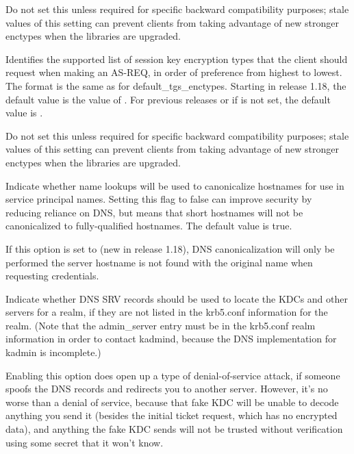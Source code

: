 \documentclass[letterpaper,10pt,english]{sphinxmanual}
\begin{document}
\begin{description}
Do not set this unless required for specific backward
compatibility purposes; stale values of this setting can prevent
clients from taking advantage of new stronger enctypes when the
libraries are upgraded.

\item[{\sphinxstylestrong{default\_tkt\_enctypes}}] \leavevmode
Identifies the supported list of session key encryption types that
the client should request when making an AS-REQ, in order of
preference from highest to lowest.  The format is the same as for
default\_tgs\_enctypes.  Starting in release 1.18, the default
value is the value of .  For previous
releases or if  is not set, the default
value is .

Do not set this unless required for specific backward
compatibility purposes; stale values of this setting can prevent
clients from taking advantage of new stronger enctypes when the
libraries are upgraded.

\item[{\sphinxstylestrong{dns\_canonicalize\_hostname}}] \leavevmode
Indicate whether name lookups will be used to canonicalize
hostnames for use in service principal names.  Setting this flag
to false can improve security by reducing reliance on DNS, but
means that short hostnames will not be canonicalized to
fully-qualified hostnames.  The default value is true.

If this option is set to  (new in release 1.18), DNS
canonicalization will only be performed the server hostname is not
found with the original name when requesting credentials.

\item[{\sphinxstylestrong{dns\_lookup\_kdc}}] \leavevmode
Indicate whether DNS SRV records should be used to locate the KDCs
and other servers for a realm, if they are not listed in the
krb5.conf information for the realm.  (Note that the admin\_server
entry must be in the krb5.conf realm information in order to
contact kadmind, because the DNS implementation for kadmin is
incomplete.)

Enabling this option does open up a type of denial-of-service
attack, if someone spoofs the DNS records and redirects you to
another server.  However, it’s no worse than a denial of service,
because that fake KDC will be unable to decode anything you send
it (besides the initial ticket request, which has no encrypted
data), and anything the fake KDC sends will not be trusted without
verification using some secret that it won’t know.


\end{description}
\end{document}

